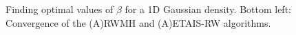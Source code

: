 \documentclass[final]{siamltex}
\begin{document}
\begin{figure}[htb]
\centering
{}

\caption{Finding optimal values of $\beta$ for a 1D Gaussian density. Bottom left: Convergence of the (A)RWMH and (A)ETAIS-RW algorithms.}
\label{fig:P1 opt beta}
\end{figure}
\end{document}
